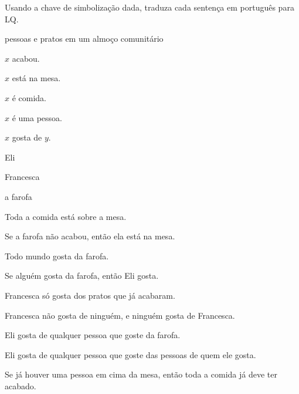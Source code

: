 \problempart
Usando a chave de simbolização dada, traduza cada sentença em português para LQ.
\begin{ekey}
\item[UD:] pessoas e pratos em um almoço comunitário
\item[Rx:] $x$ acabou.
\item[Tx:] $x$ está na mesa.
\item[Fx:] $x$ é comida.
\item[Px:] $x$ é uma pessoa.
\item[Lxy:] $x$ gosta de $y$.
\item[e:] Eli
\item[f:] Francesca
\item[g:] a farofa
\end{ekey}
\begin{earg}
\item Toda a comida está sobre a mesa.
\item Se a farofa não acabou, então ela está na mesa.
\item Todo mundo gosta da farofa.
\item Se alguém gosta da farofa, então Eli gosta.
\item Francesca só gosta dos pratos que já acabaram.
\item Francesca não gosta de ninguém, e ninguém gosta de Francesca.
\item Eli gosta de qualquer pessoa que goste da farofa.
\item Eli gosta de qualquer pessoa que goste das pessoas de quem ele gosta.
\item Se já houver uma pessoa em cima da mesa, então toda a comida já deve ter acabado.
\end{earg}


